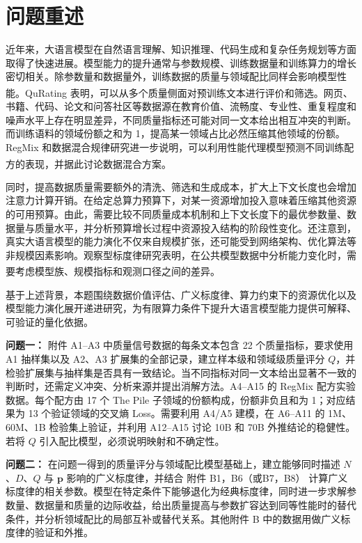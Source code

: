 \documentclass[bwprint]{gmcmthesis}
\numberwithin{equation}{section}
\numberwithin{figure}{section}
\numberwithin{table}{section}
\begin{document}
\pagestyle{plain}

\tableofcontents    %
\clearpage


\section{问题重述}  %
近年来，大语言模型在自然语言理解、知识推理、代码生成和复杂任务规划等方面取得了快速进展。模型能力的提升通常与参数规模、训练数据量和训练算力的增长密切相关。除参数量和数据量外，训练数据的质量与领域配比同样会影响模型性能。QuRating 表明，可以从多个质量侧面对预训练文本进行评价和筛选\textsuperscript{\cite{wettig2024qurating}}。网页、书籍、代码、论文和问答社区等数据源在教育价值、流畅度、专业性、重复程度和噪声水平上存在明显差异，不同质量指标还可能对同一文本给出相互冲突的判断。而训练语料的领域份额之和为 1，提高某一领域占比必然压缩其他领域的份额。RegMix 和数据混合规律研究进一步说明，可以利用性能代理模型预测不同训练配方的表现，并据此讨论数据混合方案\textsuperscript{\cite{liu2025regmix,ye2025mixing}}。

同时，提高数据质量需要额外的清洗、筛选和生成成本，扩大上下文长度也会增加注意力计算开销。在给定总算力预算下，对某一资源增加投入意味着压缩其他资源的可用预算。由此，需要比较不同质量成本机制和上下文长度下的最优参数量、数据量与质量水平，并分析预算增长过程中资源投入结构的阶段性变化。还注意到，真实大语言模型的能力演化不仅来自规模扩张，还可能受到网络架构、优化算法等非规模因素影响。观察型标度律研究表明，在公共模型数据中分析能力变化时，需要考虑模型族、规模指标和观测口径之间的差异\textsuperscript{\cite{ruan2024observational}}。

基于上述背景，本题围绕数据价值评估、广义标度律、算力约束下的资源优化以及模型能力演化展开递进研究，为有限算力条件下提升大语言模型能力提供可解释、可验证的量化依据。

\textbf{问题一：}
附件 A1--A3 中质量信号数据的每条文本包含 22 个质量指标，要求使用 A1 抽样集以及 A2、A3 扩展集的全部记录，建立样本级和领域级质量评分 $Q$，并检验扩展集与抽样集是否具有一致结论。当不同指标对同一文本给出显著不一致的判断时，还需定义冲突、分析来源并提出消解方法。A4--A15 的 RegMix 配方实验数据。每个配方由 17 个 The Pile 子领域的份额构成，份额非负且和为 1；对应结果为 13 个验证领域的交叉熵 Loss。需要利用 A4/A5 建模，在 A6--A11 的 1M、60M、1B 检验集上验证，并利用 A12--A15 讨论 10B 和 70B 外推结论的稳健性。若将 $Q$ 引入配比模型，必须说明映射和不确定性。

\textbf{问题二：}
在问题一得到的质量评分与领域配比模型基础上，建立能够同时描述 $N$、$D$、$Q$ 与 $\bm p$ 影响的广义标度律，并结合 附件 B1，B6（或B7，B8） 计算广义标度律的相关参数。模型在特定条件下能够退化为经典标度律，同时进一步求解参数量、数据量和质量的边际收益，给出质量提高与参数扩容达到同等性能时的替代条件，并分析领域配比的局部互补或替代关系。其他附件 B 中的数据用做广义标度律的验证和外推。
\end{document}
